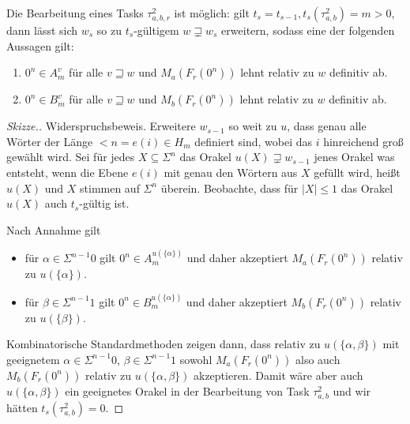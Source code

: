 \begin{lemma}\label{lemma:myoracle-disjnp}
    Die Bearbeitung eines Tasks $\tau^2_{a,b,r}$ ist möglich: gilt $t_s=t_{s-1}, t_{s}(\tau^2_{a,b})=m>0$, dann lässt sich $w_{s}$ so zu $t_{s}$-gültigem $w\sqsupsetneq w_{s}$ erweitern, sodass eine der folgenden Aussagen gilt:
    \begin{enumerate}[nosep,endpenalty=10000]
        \item $0^n\in A_m^v$ für alle $v\sqsupseteq w$ und $M_a(F_r(0^n))$ lehnt relativ zu $w$ definitiv ab.
        \item $0^n\in B_m^v$ für alle $v\sqsupseteq w$ und $M_b(F_r(0^n))$ lehnt relativ zu $w$ definitiv ab.
    \end{enumerate}
\end{lemma}
\begin{proof}[Skizze.]
    Widerspruchsbeweis. Erweitere $w_{s-1}$ so weit zu $u$, dass genau alle Wörter der Länge $<n=e(i)\in H_m$ definiert sind, wobei das $i$ hinreichend groß gewählt wird. Sei für jedes $X\subseteq \Sigma^n$ das Orakel $u(X)\sqsupsetneq w_{s-1}$ jenes Orakel was entsteht, wenn die Ebene $e(i)$ mit genau den Wörtern aus $X$ gefüllt wird, heißt $u(X)$ und $X$ stimmen auf $\Sigma^n$ überein. Beobachte, dass für $|X|\leq 1$ das Orakel $u(X)$ auch $t_{s}$-gültig ist.

    Nach Annahme gilt
    \begin{itemize}[nosep]
        \item für $\alpha\in \Sigma^{n-1}0$ gilt $0^n\in A_m^{u(\{\alpha\})}$ und daher akzeptiert $M_a(F_r(0^n))$ relativ zu $u(\{\alpha\})$.
        \item für $\beta\in \Sigma^{n-1}1$ gilt $0^n\in B_m^{u(\{\alpha\})}$ und daher akzeptiert $M_b(F_r(0^n))$ relativ zu $u(\{\beta\})$.
    \end{itemize}
    Kombinatorische Standardmethoden zeigen dann, dass relativ zu $u(\{\alpha,\beta\})$ mit geeignetem $\alpha\in\Sigma^{n-1}0$, $\beta\in\Sigma^{n-1}1$ sowohl $M_a(F_r(0^n))$ also auch $M_b(F_r(0^n))$ relativ zu $u(\{\alpha,\beta\})$ akzeptieren.
    Damit wäre aber auch $u(\{\alpha,\beta\})$ ein geeignetes Orakel in der Bearbeitung von Task $\tau^2_{a,b}$ und wir hätten $t_{s}(\tau^2_{a,b})=0$.
\end{proof}
